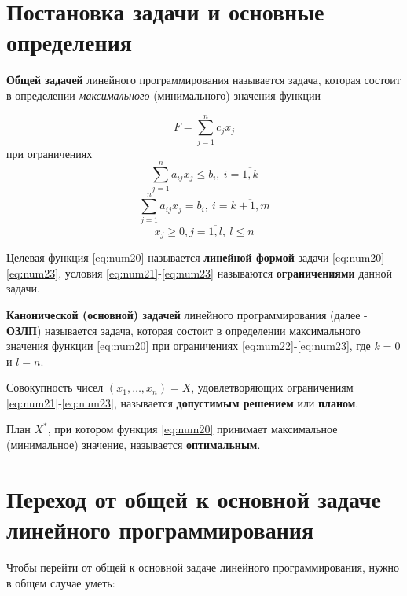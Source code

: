 \documentclass[a4paper,12pt]{report}
\begin{document}
\section{Постановка задачи и основные определения}

\textbf{Общей задачей} линейного программирования называется задача, которая состоит в определении \textit{максимального} (минимального) значения функции

\begin{equation}
\label{eq:num20}
F = \sum\limits_{j=1}^n c_{j}x_{j}
\end{equation}
при ограничениях
\begin{equation}
\label{eq:num21}
\sum\limits_{j=1}^n a_{ij}x_{j} \leq b_{i},\ i=\overline{1,k}
\end{equation}
\begin{equation}
\label{eq:num22}
\sum\limits_{j=1}^n a_{ij}x_{j} = b_{i},\ i=\overline{k+1,m}
\end{equation}
\begin{equation}
\label{eq:num23}
x_{j} \geq 0, j=\overline{1,l},\ l \leq n
\end{equation}

Целевая функция \eqref{eq:num20} называется \textbf{линейной формой} задачи \eqref{eq:num20}-\eqref{eq:num23}, условия \eqref{eq:num21}-\eqref{eq:num23} называются \textbf{ограничениями} данной задачи.

\textbf{Канонической (основной) задачей} линейного программирования (далее - \textbf{ОЗЛП}) называется задача, которая состоит в определении максимального значения функции \eqref{eq:num20} при ограничениях \eqref{eq:num22}-\eqref{eq:num23}, где $k = 0$ и $l = n$.

Совокупность чисел $(x_{1}, \ldots, x_{n}) = X$, удовлетворяющих ограничениям \eqref{eq:num21}-\eqref{eq:num23}, называется \textbf{допустимым решением} или \textbf{планом}.

План $X^{*}$, при котором функция \eqref{eq:num20} принимает максимальное (минимальное) значение, называется \textbf{оптимальным}.

\section{Переход от общей к основной задаче линейного программирования}

Чтобы перейти от общей к основной задаче линейного программирования, нужно в общем случае уметь:
\end{document}
